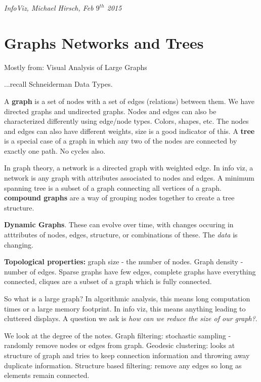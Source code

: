 \documentclass[]{article}
\begin{document}
\begin{flushright}
	\textit{InfoViz, Michael Hirsch, Feb $9^{th}$ 2015}
\end{flushright}

\section{Graphs Networks and Trees}

Mostly from: Visual Analysis of Large Graphs

...recall Schneiderman Data Types.

A \textbf{graph} is a set of nodes with a set of edges (relations) between them. We have directed graphs and undirected graphs. Nodes and edges can also be characterized differently using edge/node types. Colors, shapes, etc. The nodes and edges can also have different weights, size is a good indicator of this. A \textbf{tree} is a special case of a graph in which any two of the nodes are connected by exactly one path. No cycles also. 

In graph theory, a network is a directed graph with weighted edge. In info viz, a network is any graph with attributes associated to nodes and edges. A minimum spanning tree is a subset of a graph connecting all vertices of a graph. \textbf{compound graphs} are a way of grouping nodes together to create a tree structure.

\textbf{Dynamic Graphs}. These can evolve over time, with changes occuring in atttributes of nodes, edges, structure, or combinations of these. The \textit{data} is changing. 

\textbf{Topological properties:} graph size - the number of nodes. Graph density - number of edges. Sparse graphs have few edges, complete graphs have everything connected, cliques are a subset of a graph which is fully connected.

So what is a large graph? In algorithmic analysis, this means long computation times or a large memory footprint. In info viz, this means anything leading to cluttered displays. A question we ask is \textit{how can we reduce the size of our graph?}.

We look at the degree of the notes. Graph filtering: stochastic sampling - randomly remove nodes or edges from graph. Geodesic clustering: looks at structure of graph and tries to keep connection information and throwing away duplicate information. Structure based filtering: remove any edges so long as elements remain connected.	
\end{document}
